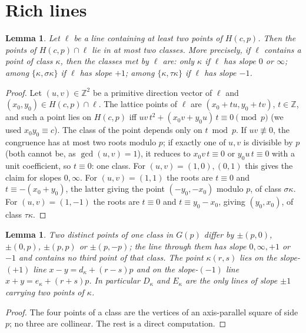 \documentclass[11pt]{article}
\newtheorem{lemma}[theorem]{Lemma}
\theoremstyle{remark}
\newcommand{\Z}{\mathbb{Z}}
\newcommand{\Hc}{H(c,p)}
\newcommand{\Gp}{G(p)}
\begin{document}
\section{Rich lines}

\begin{lemma}\label{lem:lagrange}
Let $\ell$ be a line containing at least two points of $\Hc$.  Then the points of $\Hc\cap\ell$ lie in at most two
classes.  More precisely, if $\ell$ contains a point of class $\kappa$, then the classes met by $\ell$ are:
only $\kappa$ if $\ell$ has slope $0$ or $\infty$; among $\{\kappa,\sigma\kappa\}$ if $\ell$ has slope $+1$;
among $\{\kappa,\tau\kappa\}$ if $\ell$ has slope $-1$.
\end{lemma}

\begin{proof}
Let $(u,v)\in\Z^2$ be a primitive direction vector of $\ell$ and $(x_0,y_0)\in\Hc\cap\ell$.  The lattice points of
$\ell$ are $(x_0+tu,y_0+tv)$, $t\in\Z$, and such a point lies on $\Hc$ iff
$uv\,t^2+(x_0v+y_0u)\,t\equiv0\pmod p$ (we used $x_0y_0\equiv c$).  The class of the point depends only on
$t\bmod p$.  If $uv\not\equiv0$, the congruence has at most two roots modulo $p$; if exactly one of $u,v$ is
divisible by $p$ (both cannot be, as $\gcd(u,v)=1$), it reduces to $x_0v\,t\equiv0$ or $y_0u\,t\equiv0$ with a unit
coefficient, so $t\equiv0$: one class.  For $(u,v)=(1,0),(0,1)$ this gives the claim for slopes $0,\infty$.
For $(u,v)=(1,1)$ the roots are $t\equiv0$ and $t\equiv-(x_0+y_0)$, the latter giving the point
$(-y_0,-x_0)$ modulo $p$, of class $\sigma\kappa$.  For $(u,v)=(1,-1)$ the roots are $t\equiv0$ and
$t\equiv y_0-x_0$, giving $(y_0,x_0)$, of class $\tau\kappa$.
\end{proof}

\begin{lemma}\label{lem:copies}
Two distinct points of one class in $\Gp$ differ by $\pm(p,0)$, $\pm(0,p)$, $\pm(p,p)$ or $\pm(p,-p)$; the line
through them has slope $0,\infty,+1$ or $-1$ and contains no third point of that class.  The point $\kappa(r,s)$ lies
on the slope-$(+1)$ line $x-y=d_\kappa+(r-s)p$ and on the slope-$(-1)$ line $x+y=e_\kappa+(r+s)p$.  In particular
$D_\kappa$ and $E_\kappa$ are the only lines of slope $\pm1$ carrying two points of $\kappa$.
\end{lemma}

\begin{proof}
The four points of a class are the vertices of an axis-parallel square of side $p$; no three are collinear.
The rest is a direct computation.
\end{proof}
\end{document}
